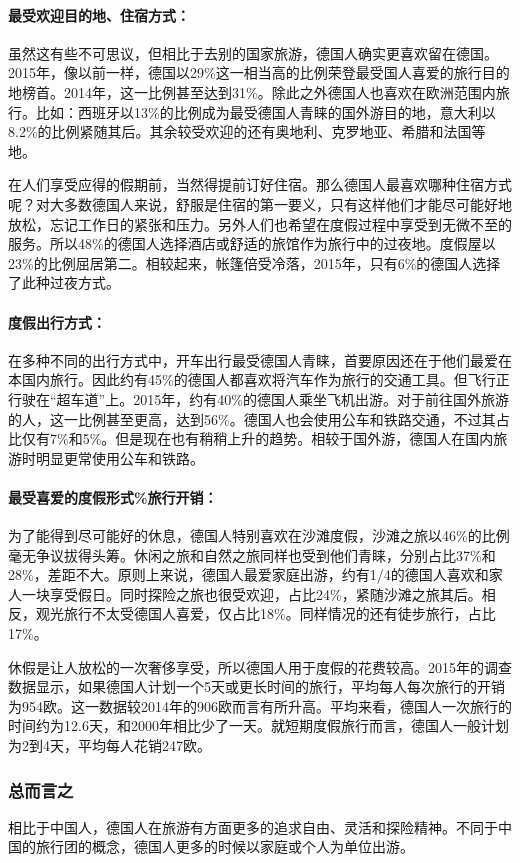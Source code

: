 \paragraph{最受欢迎目的地、住宿方式：}

虽然这有些不可思议，但相比于去别的国家旅游，德国人确实更喜欢留在德国。2015年，像以前一样，德国以29\%这一相当高的比例荣登最受国人喜爱的旅行目的地榜首。2014年，这一比例甚至达到31\%。除此之外德国人也喜欢在欧洲范围内旅行。比如：西班牙以13\%的比例成为最受德国人青睐的国外游目的地，意大利以8.2\%的比例紧随其后。其余较受欢迎的还有奥地利、克罗地亚、希腊和法国等地。

在人们享受应得的假期前，当然得提前订好住宿。那么德国人最喜欢哪种住宿方式呢？对大多数德国人来说，舒服是住宿的第一要义，只有这样他们才能尽可能好地放松，忘记工作日的紧张和压力。另外人们也希望在度假过程中享受到无微不至的服务。所以48\%的德国人选择酒店或舒适的旅馆作为旅行中的过夜地。度假屋以23\%的比例屈居第二。相较起来，帐篷倍受冷落，2015年，只有6\%的德国人选择了此种过夜方式。



\paragraph{度假出行方式：}

在多种不同的出行方式中，开车出行最受德国人青睐，首要原因还在于他们最爱在本国内旅行。因此约有45\%的德国人都喜欢将汽车作为旅行的交通工具。但飞行正行驶在“超车道”上。2015年，约有40\%的德国人乘坐飞机出游。对于前往国外旅游的人，这一比例甚至更高，达到56\%。德国人也会使用公车和铁路交通，不过其占比仅有7\%和5\%。但是现在也有稍稍上升的趋势。相较于国外游，德国人在国内旅游时明显更常使用公车和铁路。



\paragraph{最受喜爱的度假形式\%旅行开销：}

为了能得到尽可能好的休息，德国人特别喜欢在沙滩度假，沙滩之旅以46\%的比例毫无争议拔得头筹。休闲之旅和自然之旅同样也受到他们青睐，分别占比37\%和28\%，差距不大。原则上来说，德国人最爱家庭出游，约有1/4的德国人喜欢和家人一块享受假日。同时探险之旅也很受欢迎，占比24\%，紧随沙滩之旅其后。相反，观光旅行不太受德国人喜爱，仅占比18\%。同样情况的还有徒步旅行，占比17\%。

休假是让人放松的一次奢侈享受，所以德国人用于度假的花费较高。2015年的调查数据显示，如果德国人计划一个5天或更长时间的旅行，平均每人每次旅行的开销为954欧。这一数据较2014年的906欧而言有所升高。平均来看，德国人一次旅行的时间约为12.6天，和2000年相比少了一天。就短期度假旅行而言，德国人一般计划为2到4天，平均每人花销247欧。

\subsubsection{总而言之}

相比于中国人，德国人在旅游有方面更多的追求自由、灵活和探险精神。不同于中国的旅行团的概念，德国人更多的时候以家庭或个人为单位出游。